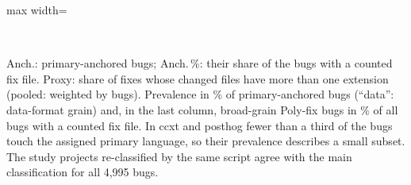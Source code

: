 \begin{table}[t]
\begin{adjustbox}{max width=\linewidth}
\begin{tabular}{lrrrrrrrr}
\bottomrule
\end{tabular}\end{adjustbox}
\\[2pt]{\footnotesize Anch.: primary-anchored bugs; Anch.\,\%: their share of the bugs with a counted fix file. Proxy: share of fixes whose changed files have more than one extension (pooled: weighted by bugs). Prevalence in \% of primary-anchored bugs (``data'': data-format grain) and, in the last column, broad-grain Poly-fix bugs in \% of all bugs with a counted fix file. In ccxt and posthog fewer than a third of the bugs touch the assigned primary language, so their prevalence describes a small subset. The study projects re-classified by the same script agree with the main classification for all 4{,}995 bugs.}
\end{table}
